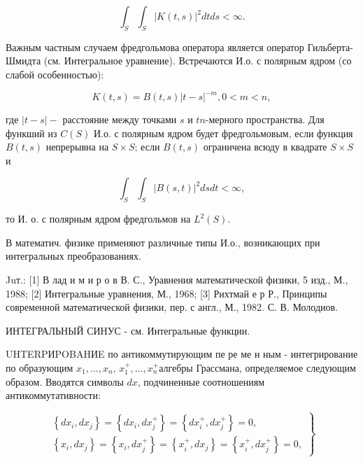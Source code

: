 \documentclass[10pt]{article}
\begin{document}
\[

\int_{S} \int_{S}|K(t, s)|^{2} d t d s<\infty .

\]



Важным частным случаем фредгольмова оператора является оператор Гильберта-Шмидта (см. Интегральное уравнение). Встречаются И.о. с полярным ядром (со слабой особенностью):



\[

K(t, s)=B(t, s)|t-s|^{-m}, 0<m<n,

\]



где $|t-s|-$ расстояние между точками $s$ и $t n$-мерного пространства. Для функший из $C(S)$ И.о. с полярным ядром будет фредгольмовым, если функция $B(t, s)$ непрерывна на $S \times S$; если $B(t, s)$ ограничена всюду в квадрате $S \times S$ и



\[

\int_{S} \int_{S}|B(s, t)|^{2} d s d t<\infty,

\]



то И. о. с полярным ядром фредгольмов на $L^{2}(S)$.



В математич. физике применяют различные типы И.о., возникающих при интегральных преобразованиях.



Juт.: [1] В лад и м и р о в В. С., Уравнения математической физики, 5 изд., М., 1988; [2] Интегральные уравнения, М., 1968; [3] Рихтмай е р Р., Принципы современной математической физики, пер. с англ., М., 1982. С. В. Молодиов.



ИНТЕГРАЛЬНЫЙ СИНУС - см. Интегральные функции.



UHTERPИPOBAHИE по антикоммутирующим пе ре ме н ным - интегрирование по образующим $x_{1}, \ldots, x_{n}$, $x_{1}^{+}, \ldots, x_{n}^{+}$алгебры Грассмана, определяемое следующим образом. Вводятся символы $d x$, подчиненные соотношениям антикоммутативности:



\[

\left.\begin{array}{c}

\left\{d x_{i}, d x_{j}\right\}=\left\{d x_{i}, d x_{j}^{+}\right\}=\left\{d x_{i}^{+}, d x_{j}^{+}\right\}=0, \\

\left\{x_{i}, d x_{j}\right\}=\left\{x_{i}, d x_{j}^{+}\right\}=\left\{x_{i}^{+}, d x_{j}\right\}=\left\{x_{i}^{+}, d x_{j}^{+}\right\}=0,

\end{array}\right\}

\]
\end{document}
